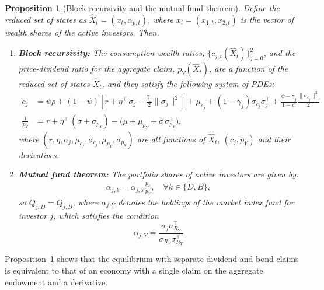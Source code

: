 \documentclass[12pt,english]{article}
\newtheorem{prop}{Proposition}
\begin{document}
\begin{prop}[Block recursivity and the mutual fund theorem]\label{prop:mft}
    Define the reduced set of states as $\hat{X}_t = (x_{t}, \overline{\alpha}_{p,t})$, where $x_{t} = (x_{1,t}, x_{2,t})$ is the vector of wealth shares of the active investors.
    Then,
    \begin{enumerate}[label=(\roman*)]
        \item \textbf{Block recursivity:} The consumption-wealth ratios, $\{c_{j,t}(\hat{X}_t)\}_{j=0}^2$, and the price-dividend ratio for the aggregate claim, $p_Y(\hat{X}_t)$, are a function of the reduced set of states $\hat{X}_t$, and they satisfy the following system of PDEs:
        \begin{align}
            c_{j} &= \psi \rho 
            + (1-\psi) \left[ r + \eta^\top\,\sigma_{j} - \frac{\gamma_j}{2} \|\sigma_{j}\|^2 \right] 
            +  \mu_{c_j} 
            + (1-\gamma_j) \sigma_{c_j} \sigma_{j}^\top 
            + \frac{\psi - \gamma_j}{1-\psi} \frac{\|\sigma_{c_j}\|^2}{2}\label{eq:pde_c_j}\\
            \frac{1}{p_{Y}} &= r + \eta^\top\,(\sigma + \sigma_{p_Y}) - \big(\mu + \mu_{p_Y} + \sigma \, \sigma_{p_Y}^\top\big)\label{eq:pde_p_Y},        
    \end{align}
    where $(r, \eta, \sigma_{j}, \mu_{c_j}, \sigma_{c_j}, \mu_{p_Y}, \sigma_{p_Y})$ are all functions of $\hat{X}_t$, $(c_j,p_Y)$ and their derivatives.    
        \item \textbf{Mutual fund theorem:} The portfolio shares of active investors are given by:
        \begin{align}
            \alpha_{j,k} = \alpha_{j,Y} \frac{p_k}{p_Y}, \quad \forall k \in \{D,B\},
        \end{align}
        so $Q_{j,D} = Q_{j,B}$, where $\alpha_{j,Y}$ denotes the holdings of the market index fund for investor $j$, which satisfies the condition
        \begin{equation}\label{eq:alpha_Y}
            \alpha_{j,Y}  = \frac{\sigma_{j} \sigma_{R_Y}^\top}{\sigma_{R_Y} \sigma_{R_Y}^\top} 
        \end{equation}
    \end{enumerate}
\end{prop}

Proposition~\ref{prop:mft} shows that the equilibrium with separate dividend and bond claims is equivalent to that of an economy with a single claim on the aggregate endowment and a derivative.
\end{document}
